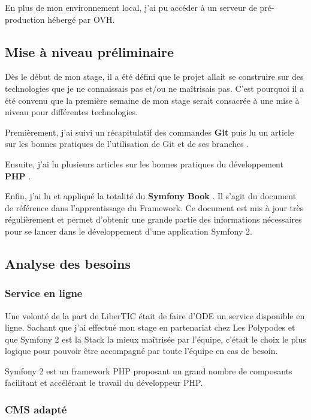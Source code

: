 En plus de mon environnement local, j'ai pu accéder à un serveur de pré-production hébergé par OVH.

\subsection{Mise à niveau préliminaire}

Dès le début de mon stage, il a été défini que le projet allait se construire sur des technologies que je ne connaissais pas et/ou ne maîtrisais pas. C'est pourquoi il a été convenu que la première semaine de mon stage serait consacrée à une mise à niveau pour différentes technologies.

Premièrement, j'ai suivi un récapitulatif des commandes \textbf{Git}  puis lu un article sur les bonnes pratiques de l'utilisation de Git et de ses branches .

Ensuite, j'ai lu plusieurs articles sur les bonnes pratiques du développement \textbf{PHP}  .

Enfin, j'ai lu et appliqué la totalité du \textbf{Symfony Book} . Il s'agit du document de référence dans l'apprentissage du Framework. Ce document est mis à jour très régulièrement et permet d'obtenir une grande partie des informations nécessaires pour se lancer dans le développement d'une application Symfony 2.

\subsection{Analyse des besoins}

\subsubsection*{Service en ligne}

Une volonté de la part de LiberTIC était de faire d'ODE un service disponible en ligne. 
Sachant que j'ai effectué mon stage en partenariat chez Les Polypodes et que Symfony 2 est la Stack la mieux maîtrisée par l'équipe, c'était le choix le plus logique pour pouvoir être accompagné par toute l'équipe en cas de besoin.

Symfony 2 est un framework PHP proposant un grand nombre de composants facilitant et accélérant le travail du développeur PHP.

\subsubsection*{CMS adapté}

